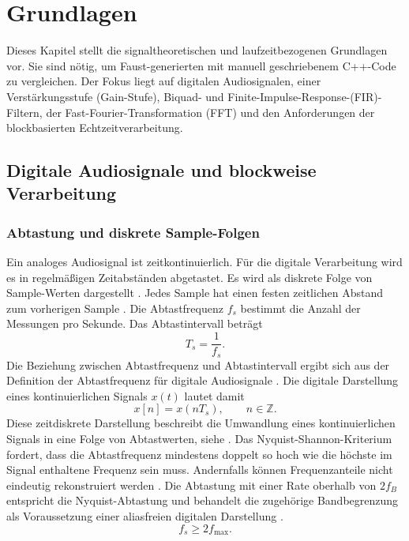 \chapter{Grundlagen}
\label{cha:grundlagen}
Dieses Kapitel stellt die signaltheoretischen und laufzeitbezogenen Grundlagen vor. Sie sind nötig, um Faust-generierten mit manuell geschriebenem C++-Code zu vergleichen. Der Fokus liegt auf digitalen Audiosignalen, einer Verstärkungsstufe (Gain-Stufe), Biquad- und Finite-Impulse-Response-(FIR)-Filtern, der Fast-Fourier-Transformation (FFT) und den Anforderungen der blockbasierten Echtzeitverarbeitung.
\section{Digitale Audiosignale und blockweise Verarbeitung}
\label{sec:digitale-audiosignale}
\subsection{Abtastung und diskrete Sample-Folgen}
Ein analoges Audiosignal ist zeitkontinuierlich. Für die digitale Verarbeitung wird es in regelmäßigen Zeitabständen abgetastet. Es wird als diskrete Folge von Sample-Werten dargestellt \parencite{rossing2007springer}. Jedes Sample hat einen festen zeitlichen Abstand zum vorherigen Sample \parencite{rossing2007springer}.
Die Abtastfrequenz $f_s$ bestimmt die Anzahl der Messungen pro Sekunde. Das Abtastintervall beträgt
\begin{equation}
	T_s = \frac{1}{f_s}.
\end{equation}
\noindent Die Beziehung zwischen Abtastfrequenz und Abtastintervall ergibt sich aus der Definition der Abtastfrequenz für digitale Audiosignale \parencite[S.~520-522]{rossing2007springer}.
Die digitale Darstellung eines kontinuierlichen Signals $x(t)$ lautet damit
\begin{equation}
	x[n] = x(nT_s), \qquad n \in \mathbb{Z}.
\end{equation}
\noindent Diese zeitdiskrete Darstellung beschreibt die Umwandlung eines kontinuierlichen Signals in eine Folge von Abtastwerten, siehe \parencite[S. 520–522]{rossing2007springer}.
Das Nyquist-Shannon-Kriterium fordert, dass die Abtastfrequenz mindestens doppelt so hoch wie die höchste im Signal enthaltene Frequenz sein muss. Andernfalls können Frequenzanteile nicht eindeutig rekonstruiert werden \parencite[Kap.~2.1, S.~19--26]{tan2018digital}. Die Abtastung mit einer Rate oberhalb von $2f_B$ entspricht die Nyquist-Abtastung und behandelt die zugehörige Bandbegrenzung als Voraussetzung einer aliasfreien digitalen Darstellung \parencite[S.~63--65]{zolzer2022digital}. 
\begin{equation}
	f_s \geq 2f_{\max}.
\end{equation}

